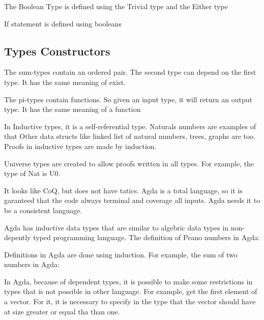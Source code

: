 \documentclass[12pt]{article}
\begin{document}
    The Boolean Type is defined using the Trivial type and the Either type

    If statement is defined using booleans

    \subsection{Types Constructors}
    The sum-types contain an ordered pair.
    The second type can depend on the first type.
    It has the same meaning of exist.

    The pi-types contain functions.
    So given an input type, it will return an output type.
    It has the same meaning of a function

    In Inductive types, it is a self-referential type.
    Naturals numbers are examples of that
    Other data structs like linked list of natural numbers, trees, graphs are too.
    Proofs in inductive types are made by induction.

    Universe types are created to allow proofs written in all types.
    For example, the type of Nat is U0.


It looks like CoQ, but does not have tatics.
Agda is a total language, so it is garanteed that the code always terminal and coverage all inputs.
Agda needs it to be a consistent language.

Agda has inductive data types that are similar to algebric data types in non-depently typed programming language.
The definition of Peano numbers in Agda:


Definitions in Agda are done using induction.
For example, the sum of two numbers in Agda:


In Agda, because of dependent types, it is possible to make some restrictions in types that is not possible in other language.
For example, get the first element of a vector.
For it, it is necessary to specify in the type that the vector should have at size greater or equal tha than one.

\end{document}
